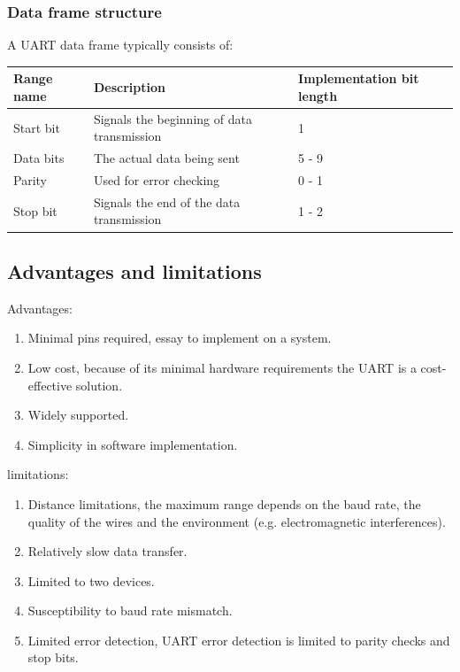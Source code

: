 \documentclass[12pt]{article}
\begin{document}
\subsubsection{Data frame structure}
A UART data frame typically consists of: \\

\begin{table}[h]
  \centering
  \begin{tabular}{|p{3cm}|p{6cm}|p{3.5cm}|}
    \hline
    \textbf{Range name} & \textbf{Description} & \textbf{Implementation bit length} \\
    \hline
    Start bit & Signals the beginning of data transmission & 1 \\
    \hline
    Data bits & The actual data being sent & 5 - 9 \\
    \hline
    Parity & Used for error checking & 0 - 1 \\
    \hline
    Stop bit & Signals the end of the data transmission & 1 - 2 \\
    \hline
  \end{tabular}
\end{table}

\subsection{Advantages and limitations}
Advantages:
\begin{enumerate}
  \item Minimal pins required, essay to implement on a system.
  \item Low cost, because of its minimal hardware requirements the UART is a
        cost-effective solution.
  \item Widely supported.
  \item Simplicity in software implementation.
\end{enumerate}
limitations:
\begin{enumerate}
  \item Distance limitations, the maximum range depends on the baud rate, the quality
        of the wires and the environment (e.g. electromagnetic interferences).
  \item Relatively slow data transfer.
  \item Limited to two devices.
  \item Susceptibility to baud rate mismatch.
  \item Limited error detection, UART error detection is limited to parity checks and
        stop bits.
\end{enumerate}
\end{document}
